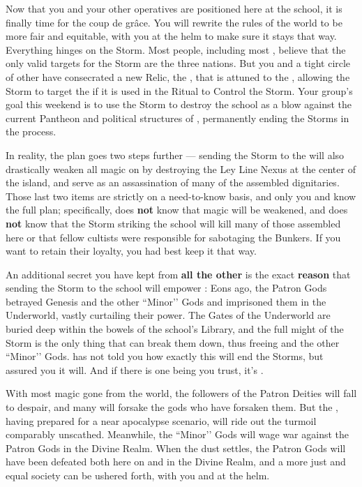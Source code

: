 \documentclass[char]{GL2020}
\begin{document}
Now that you and your other operatives are positioned here at the school, it is finally time for the coup de grâce. You will rewrite the rules of the world to be more fair and equitable, with you at the helm to make sure it stays that way. Everything hinges on the Storm. Most people, including most \pGoaties{}, believe that the only valid targets for the Storm are the three nations. But you and a tight circle of other \pGoaties{} have consecrated a new Relic, the \iHorseshoe{}, that is attuned to the \pSchool{}, allowing the Storm to target the \pSc{} if it is used in the Ritual to Control the Storm. Your group's goal this weekend is to use the Storm to destroy the school as a blow against the current Pantheon and political structures of \pEarth{}, permanently ending the Storms in the process. 

In reality, the plan goes two steps further — sending the Storm to the \pSc{} will also drastically weaken all magic on \pEarth{} by destroying the Ley Line Nexus at the center of the island, and serve as an assassination of many of the assembled dignitaries. Those last two items are strictly on a need-to-know basis, and only you and \cChupSecond{} know the full plan; specifically, \cChupInventor{} does \textbf{not} know that magic will be weakened, and \cChupStudent{} does \textbf{not} know that the Storm striking the school will kill many of those assembled here or that \cChupStudent{\their} fellow cultists were responsible for sabotaging the Bunkers. If you want to retain their loyalty, you had best keep it that way. 

An additional secret you have kept from \textbf{all the other} \pGoaties{} is the exact \textbf{reason} that sending the Storm to the school will empower \cGenesis{}: Eons ago, the Patron Gods betrayed Genesis and the other ``Minor’’ Gods and imprisoned them in the Underworld, vastly curtailing their power. The Gates of the Underworld are buried deep within the bowels of the school’s Library, and the full might of the Storm is the only thing that can break them down, thus freeing \cGenesis{} and the other ``Minor’’ Gods. \cGenesis{} has not told you how exactly this will end the Storms, but \cGenesis{\they} \cGenesis{\have} assured you it will. And if there is one being you trust, it's \cGenesis{}.

With most magic gone from the world, the followers of the Patron Deities will fall to despair, and many will forsake the gods who have forsaken them. But the \pGoaties{}, having prepared for a near apocalypse scenario, will ride out the turmoil comparably unscathed. Meanwhile, the ``Minor’’ Gods will wage war against the Patron Gods in the Divine Realm. When the dust settles, the Patron Gods will have been defeated both here on \pEarth{} and in the Divine Realm, and a more just and equal society can be ushered forth, with you and \cGenesis{} at the helm.
\end{document}
